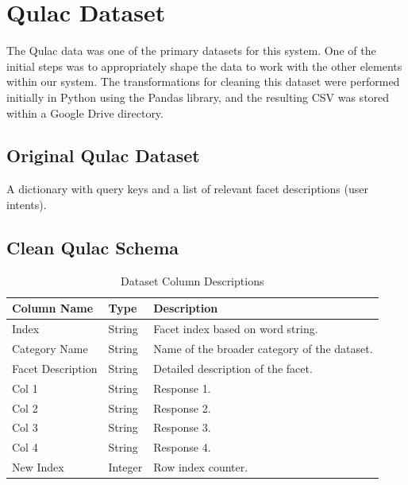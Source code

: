 \documentclass[11pt]{article}
\begin{document}
\section{Qulac Dataset}
The Qulac data was one of the primary datasets for this system. One of the initial steps was to appropriately shape the data to work with the other elements within our system. The transformations for cleaning this dataset were performed initially in Python using the Pandas library, and the resulting CSV was stored within a Google Drive directory.

\subsection{Original Qulac Dataset}
A dictionary with query keys and a list of relevant facet descriptions (user intents).

\subsection{Clean Qulac Schema}
\renewcommand{\arraystretch}{1.2} %

\begin{table}[ht]
  \centering
  \caption{Dataset Column Descriptions}
  \label{tab:dataset-columns}
  \begin{tabular}{@{} l l p{5cm} @{}}
    \hline
    \textbf{Column Name}  & \textbf{Type}    & \textbf{Description}                               \\ 
    \hline
    Index                 & String           & Facet index based on word string.                  \\ 
    Category Name         & String           & Name of the broader category of the dataset.       \\ 
    Facet Description     & String           & Detailed description of the facet.                 \\ 
    Col 1                 & String           & Response 1.                                         \\ 
    Col 2                 & String           & Response 2.                                         \\ 
    Col 3                 & String           & Response 3.                                         \\ 
    Col 4                 & String           & Response 4.                                         \\ 
    New Index             & Integer          & Row index counter.                                 \\ 
    \hline
  \end{tabular}
\end{table}
\end{document}
